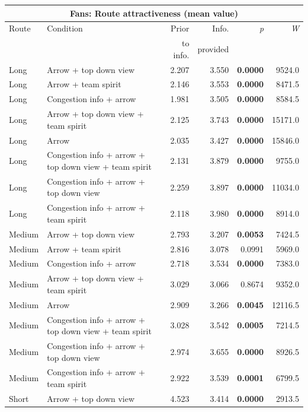 \begin{table}
\begin{scriptsize}
\begin{tabular}{llrrrr}
\multicolumn{6}{c}{ \textbf{Fans: Route attractiveness (mean value)}} \\
  \hline
 Route & Condition & Prior  & Info.  & \textit{p} & \textit{W} \\
   &  &  to info. & provided &  &  \\
  \hline
 Long & Arrow + top down view & 2.207 & 3.550 & \textbf{0.0000} & 9524.0 \\ 
 Long & Arrow + team spirit & 2.146 & 3.553 & \textbf{0.0000} & 8471.5 \\ 
 Long & Congestion info + arrow & 1.981 & 3.505 & \textbf{0.0000} & 8584.5 \\ 
 Long & Arrow + top down view + team spirit & 2.125 & 3.743 & \textbf{0.0000} & 15171.0 \\ 
 Long & Arrow & 2.035 & 3.427 & \textbf{0.0000} & 15846.0 \\ 
 Long & Congestion info + arrow + top down view + team spirit & 2.131 & 3.879 & \textbf{0.0000} & 9755.0 \\ 
 Long & Congestion info + arrow + top down view & 2.259 & 3.897 & \textbf{0.0000} & 11034.0 \\ 
 Long & Congestion info + arrow + team spirit & 2.118 & 3.980 & \textbf{0.0000} & 8914.0 \\ 
 \hline
 Medium & Arrow + top down view & 2.793 & 3.207 & \textbf{0.0053} & 7424.5 \\ 
 Medium & Arrow + team spirit & 2.816 & 3.078 & 0.0991 & 5969.0 \\ 
 Medium & Congestion info + arrow & 2.718 & 3.534 & \textbf{0.0000} & 7383.0 \\ 
 Medium & Arrow + top down view + team spirit & 3.029 & 3.066 & 0.8674 & 9352.0 \\ 
 Medium & Arrow & 2.909 & 3.266 & \textbf{0.0045} & 12116.5 \\ 
 Medium & Congestion info + arrow + top down view + team spirit & 3.028 & 3.542 & \textbf{0.0005} & 7214.5 \\ 
 Medium & Congestion info + arrow + top down view & 2.974 & 3.655 & \textbf{0.0000} & 8926.5 \\ 
 Medium & Congestion info + arrow + team spirit & 2.922 & 3.539 & \textbf{0.0001} & 6799.5 \\ 
 \hline
 Short & Arrow + top down view & 4.523 & 3.414 & \textbf{0.0000} & 2913.5 \\ 

\end{tabular}
\end{scriptsize}
\end{table}
